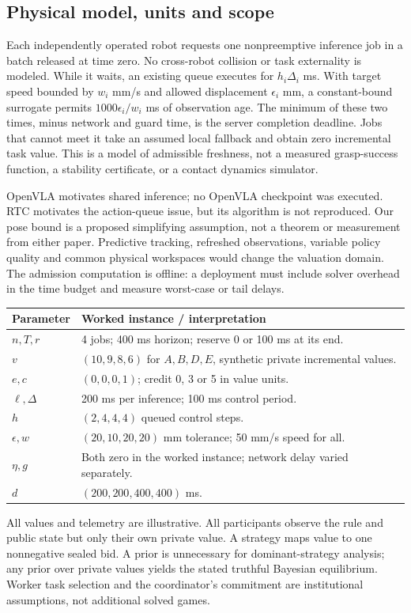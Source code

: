 \subsection{Physical model, units and scope}
Each independently operated robot requests one nonpreemptive inference job in a batch released at time zero. No cross-robot collision or task externality is modeled. While it waits, an existing queue executes for $h_i\Delta_i$ ms. With target speed bounded by $w_i$ mm/s and allowed displacement $\epsilon_i$ mm, a constant-bound surrogate permits $1000\epsilon_i/w_i$ ms of observation age. The minimum of these two times, minus network and guard time, is the server completion deadline. Jobs that cannot meet it take an assumed local fallback and obtain zero incremental task value. This is a model of admissible freshness, not a measured grasp-success function, a stability certificate, or a contact dynamics simulator.

OpenVLA motivates shared inference; no OpenVLA checkpoint was executed. RTC motivates the action-queue issue, but its algorithm is not reproduced. Our pose bound is a proposed simplifying assumption, not a theorem or measurement from either paper. Predictive tracking, refreshed observations, variable policy quality and common physical workspaces would change the valuation domain. The admission computation is offline: a deployment must include solver overhead in the time budget and measure worst-case or tail delays.

\begin{center}\small
\begin{tabularx}{\columnwidth}{lY}\toprule
Parameter & Worked instance / interpretation\\\midrule
$n,T,r$ & 4 jobs; 400 ms horizon; reserve 0 or 100 ms at its end.\\
$v$ & $(10,9,8,6)$ for $A,B,D,E$, synthetic private incremental values.\\
$e,c$ & $(0,0,0,1)$; credit 0, 3 or 5 in value units.\\
$\ell,\Delta$ & 200 ms per inference; 100 ms control period.\\
$h$ & $(2,4,4,4)$ queued control steps.\\
$\epsilon,w$ & $(20,10,20,20)$ mm tolerance; 50 mm/s speed for all.\\
$\eta,g$ & Both zero in the worked instance; network delay varied separately.\\
$d$ & $(200,200,400,400)$ ms.\\\bottomrule
\end{tabularx}
\end{center}
All values and telemetry are illustrative. All participants observe the rule and public state but only their own private value. A strategy maps value to one nonnegative sealed bid. A prior is unnecessary for dominant-strategy analysis; any prior over private values yields the stated truthful Bayesian equilibrium. Worker task selection and the coordinator's commitment are institutional assumptions, not additional solved games.

